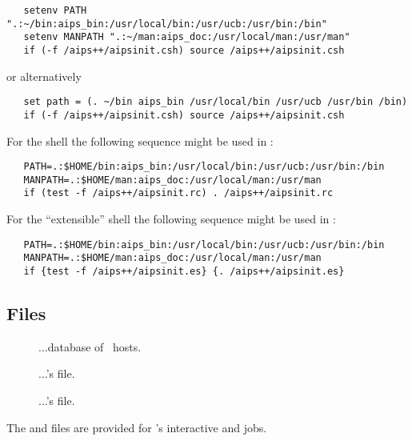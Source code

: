 \begin{verbatim}
   setenv PATH ".:~/bin:aips_bin:/usr/local/bin:/usr/ucb:/usr/bin:/bin"
   setenv MANPATH ".:~/man:aips_doc:/usr/local/man:/usr/man"
   if (-f /aips++/aipsinit.csh) source /aips++/aipsinit.csh
\end{verbatim}

\noindent
or alternatively

\begin{verbatim}
   set path = (. ~/bin aips_bin /usr/local/bin /usr/ucb /usr/bin /bin)
   if (-f /aips++/aipsinit.csh) source /aips++/aipsinit.csh
\end{verbatim}

\noindent
For the  shell the following sequence might be used in
:

\begin{verbatim}
   PATH=.:$HOME/bin:aips_bin:/usr/local/bin:/usr/ucb:/usr/bin:/bin
   MANPATH=.:$HOME/man:aips_doc:/usr/local/man:/usr/man
   if (test -f /aips++/aipsinit.rc) . /aips++/aipsinit.rc
\end{verbatim}

\noindent
For the  ``extensible'' shell the following sequence might be used
in :

\begin{verbatim}
   PATH=.:$HOME/bin:aips_bin:/usr/local/bin:/usr/ucb:/usr/bin:/bin
   MANPATH=.:$HOME/man:aips_doc:/usr/local/man:/usr/man
   if {test -f /aips++/aipsinit.es} {. /aips++/aipsinit.es}
\end{verbatim}

\subsection*{Files}

\begin{description}
\item[]
...database of \aipspp\ hosts.

\item[]
...'s  file.

\item[]
...'s  file.
\end{description}

\noindent
The  and  files are provided for
's interactive and  jobs.


